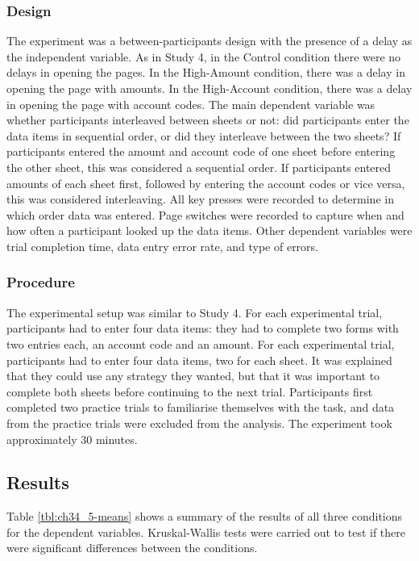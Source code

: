 \subsubsection{Design}

The experiment was a between-participants design with the presence of a delay as the independent variable. As in Study 4, in the Control condition there were no delays in opening the pages. In the High-Amount condition, there was a delay in opening the page with amounts. In the High-Account condition, there was a delay in opening the page with account codes. The main dependent variable was whether participants interleaved between sheets or not: did participants enter the data items in sequential order, or did they interleave between the two sheets? If participants entered the amount and account code of one sheet before entering the other sheet, this was considered a sequential order. If participants entered amounts of each sheet first, followed by entering the account codes or vice versa, this was considered interleaving. All key presses were recorded to determine in which order data was entered. Page switches were recorded to capture when and how often a participant looked up the data items. Other dependent variables were trial completion time, data entry error rate, and type of errors.

\subsubsection{Procedure}
The experimental setup was similar to Study 4. For each experimental trial, participants had to enter four data items: they had to complete two forms with two entries each, an account code and an amount. For each experimental trial, participants had to enter four data items, two for each sheet. It was explained that they could use any strategy they wanted, but that it was important to complete both sheets before continuing to the next trial. Participants first completed two practice trials to familiarise themselves with the task, and data from the practice trials were excluded from the analysis. The experiment took approximately 30 minutes.

\subsection{Results}
Table \ref{tbl:ch34_5-means} shows a summary of the results of all three conditions for the dependent variables. Kruskal-Wallis tests were carried out to test if there were significant differences between the conditions.

